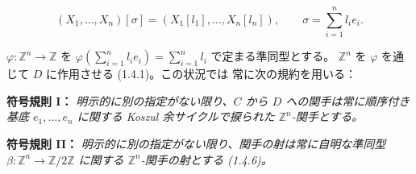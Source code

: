\begin{equation}
  (X_1,\ldots,X_n)[\sigma]
  =(X_1[l_1],\ldots,X_n[l_n]),
  \qquad
  \sigma=\sum_{i=1}^{n}l_i e_i.
  \tag{1.6.6.1}
\end{equation}

$\varphi\colon\mathbb Z^n\to\mathbb Z$ を
$\varphi(\sum_{i=1}^{n}l_i e_i)=\sum_{i=1}^{n}l_i$ で定まる準同型とする。
$\mathbb Z^n$ を $\varphi$ を通じて $D$ に作用させる (1.4.1)。この状況では
常に次の規約を用いる：

\noindent\textbf{符号規則 I：}
\emph{明示的に別の指定がない限り、$C$ から $D$ への関手は常に順序付き基底
$e_1,\ldots,e_n$ に関する Koszul 余サイクルで捩られた
$\mathbb Z^n$-関手とする。}

\noindent\textbf{符号規則 II：}
\emph{明示的に別の指定がない限り、関手の射は常に自明な準同型
$\beta\colon\mathbb Z^n\to\mathbb Z/2\mathbb Z$ に関する
$\mathbb Z^n$-関手の射とする (1.4.6)。}
